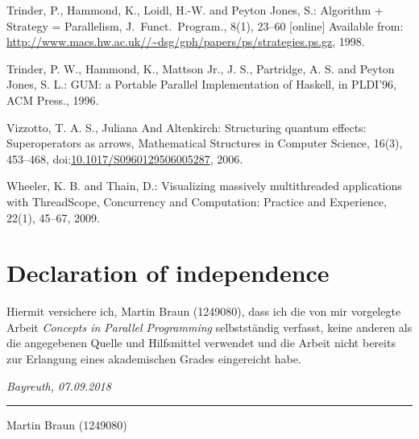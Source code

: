\documentclass[paper=A4,twoside=true,openright,parskip=full,chapterprefix=true,headings=normal,bibliography=totoc,listof=totoc,titlepage=on,captions=tableabove,draft=false,british]{scrreprt}%
\newcommand{\thesisTitle}{Concepts in Parallel Programming}
\newcommand{\thesisName}{Martin Braun (1249080)}
\newcommand{\thesisDate}{07.09.2018}
\newcommand{\thesisUniversityCity}{Bayreuth}
\begin{document}
\leavevmode\hypertarget{ref-Trinder1998a}{}%
Trinder, P., Hammond, K., Loidl, H.-W. and Peyton Jones, S.: Algorithm +
Strategy = Parallelism, J.~Funct.~Program., 8(1), 23--60 {[}online{]}
Available from:
\url{http://www.macs.hw.ac.uk//~dsg/gph/papers/ps/strategies.ps.gz},
1998.

\leavevmode\hypertarget{ref-Trinder1996}{}%
Trinder, P. W., Hammond, K., Mattson Jr., J. S., Partridge, A. S. and
Peyton Jones, S. L.: GUM: a Portable Parallel Implementation of Haskell,
in PLDI'96, ACM Press., 1996.

\leavevmode\hypertarget{ref-vizzotto_altenkirch_sabry_2006}{}%
Vizzotto, T. A. S., Juliana And Altenkirch: Structuring quantum effects:
Superoperators as arrows, Mathematical Structures in Computer Science,
16(3), 453--468,
doi:\href{https://doi.org/10.1017/S0960129506005287}{10.1017/S0960129506005287},
2006.

\leavevmode\hypertarget{ref-Wheeler2009}{}%
Wheeler, K. B. and Thain, D.: Visualizing massively multithreaded
applications with ThreadScope, Concurrency and Computation: Practice and
Experience, 22(1), 45--67, 2009.

\cleardoublepage

%
\chapter*{Declaration of independence}
\label{sec:declaration}
\thispagestyle{empty}

Hiermit versichere ich, {\thesisName}, dass ich die von mir vorgelegte Arbeit
\emph{\thesisTitle} selbstständig verfasst, keine anderen als die angegebenen
Quelle und Hilfsmittel verwendet und die  Arbeit  nicht  bereits  zur  Erlangung  eines
akademischen  Grades  eingereicht habe.

\smallskip

\noindent\textit{\thesisUniversityCity, \thesisDate}

\smallskip

\begin{flushright}
	\begin{minipage}{5cm}
		\rule{\textwidth}{1pt}
		\centering\thesisName
	\end{minipage}
\end{flushright}


\cleardoublepage


\listoffigures
\cleardoublepage

\listoftables
\cleardoublepage

\pagestyle{empty}

\clearpage
\newpage
\mbox{}

\end{document}
